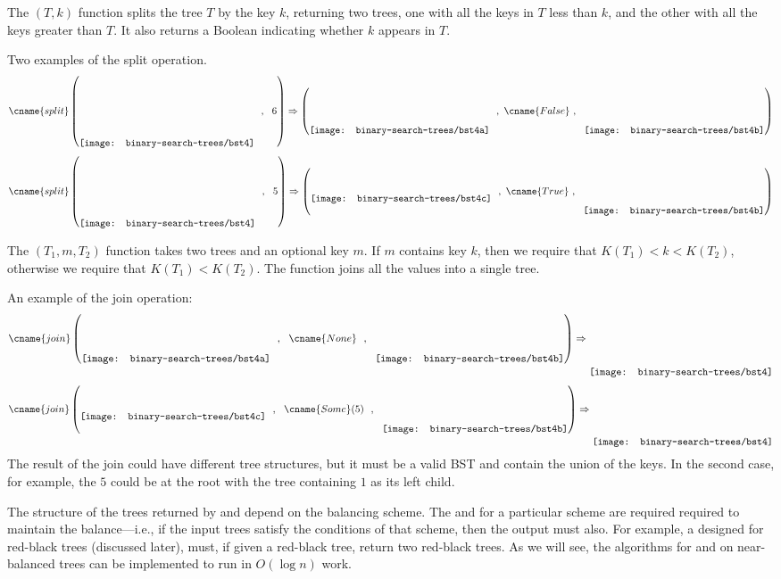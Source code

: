 The $(T,k)$ function splits the tree $T$ by the key $k$,
returning two trees, one with all the keys in $T$ less than $k$,
and the other with all the keys greater than $T$.   It also returns a
Boolean indicating whether $k$ appears in $T$.
\begin{example}
Two examples of the split operation.
\[\cname{split}\left(
\raisebox{-.45in}{\texttt{[image: binary-search-trees/bst4]}}~~,
~~6\right) \Rightarrow \left(
\raisebox{-.27in}{\texttt{[image: binary-search-trees/bst4a]}}~~,
~\cname{False}~,~~
\raisebox{-.27in}{\texttt{[image: binary-search-trees/bst4b]}}
\right) 
\]
\[\cname{split}\left(
\raisebox{-.45in}{\texttt{[image: binary-search-trees/bst4]}}~~,
~~5\right) \Rightarrow \left(
\raisebox{-.1in}{\texttt{[image: binary-search-trees/bst4c]}}~~,
~\cname{True}~,~~
\raisebox{-.27in}{\texttt{[image: binary-search-trees/bst4b]}}
\right) 
\]
\end{example}
The $(T_1,m,T_2)$ function takes two trees and an optional
key $m$.  If $m$ contains key $k$, then we require that $K(T_1) < k <
K(T_2)$, otherwise we require that $K(T_1) < K(T_2)$.  The function joins
all the values into a single tree.
\begin{example}
An example of the join operation:
\[\cname{join}\left(
\raisebox{-.27in}{\texttt{[image: binary-search-trees/bst4a]}}~~,
~~\cname{None}~~,
~~\raisebox{-.27in}{\texttt{[image: binary-search-trees/bst4b]}}
\right) \Rightarrow
\raisebox{-.45in}{\texttt{[image: binary-search-trees/bst4]}}
\]
\[\cname{join}\left(
\raisebox{-.1in}{\texttt{[image: binary-search-trees/bst4c]}}~~,
~~\cname{Some}(5)~~,
~~\raisebox{-.27in}{\texttt{[image: binary-search-trees/bst4b]}}
\right) \Rightarrow
\raisebox{-.45in}{\texttt{[image: binary-search-trees/bst4]}}
\]
The result of the join could have different tree structures, but it
must be a valid BST and contain the union of the keys.  In the second
case, for example, the $5$ could be at the root with the tree containing $1$ as its
left child.
\end{example}

The structure of the trees returned by  and 
depend on the balancing scheme.  The  and 
for a particular scheme are required required to maintain the
balance---i.e., if the input trees satisfy the conditions of that
scheme, then the output must also.  For example, a 
designed for red-black trees (discussed later), must, if given a
red-black tree, return two red-black trees.  As we will see, the
algorithms for  and  on near-balanced trees
can be implemented to run in $O(\log n)$ work.

